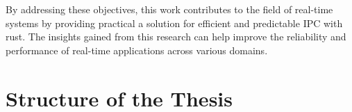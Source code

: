 By addressing these objectives, this work contributes to the field of real-time systems by providing practical a solution for efficient and predictable \ac{IPC} with rust. The insights gained from this research can help improve the reliability and performance of real-time applications across various domains.

\section{Structure of the Thesis}

